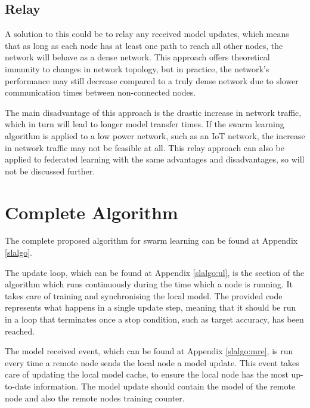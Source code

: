 \subsection{Relay} \label{relay}
A solution to this could be to relay any received model updates, which means that as long as each node has at least one path to reach all other nodes, the network will behave as a dense network. This approach offers theoretical immunity to changes in network topology, but in practice, the network's performance may still decrease compared to a truly dense network due to slower communication times between non-connected nodes.

The main disadvantage of this approach is the drastic increase in network traffic, which in turn will lead to longer model transfer times. If the swarm learning algorithm is applied to a low power network, such as an IoT network, the increase in network traffic may not be feasible at all. This relay approach can also be applied to federated learning with the same advantages and disadvantages, so will not be discussed further.

\section{Complete Algorithm}

The complete proposed algorithm for swarm learning can be found at Appendix \ref{slalgo}.

The update loop, which can be found at Appendix \ref{slalgo:ul}, is the section of the algorithm which runs continuously during the time which a node is running. It takes care of training and synchronising the local model. The provided code represents what happens in a single update step, meaning that it should be run in a loop that terminates once a stop condition, such as target accuracy, has been reached.

The model received event, which can be found at Appendix \ref{slalgo:mre}, is run every time a remote node sends the local node a model update. This event takes care of updating the local model cache, to ensure the local node has the most up-to-date information. The model update should contain the model of the remote node and also the remote nodes training counter.
